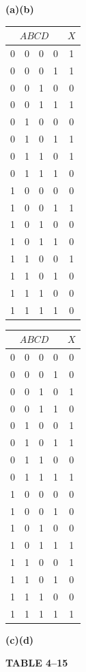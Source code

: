 \documentclass[11pt]{article}
\begin{document}
\begin{enumerate}
\begin{center}
\vspace{0.05cm}
\textbf{(a)}\hspace{2.15cm}\textbf{(b)}

\vspace{0.18cm}

\begin{tabular}{c c c c|c}
\multicolumn{4}{c|}{$ABCD$} & $X$\\ \hline
0&0&0&0&1\\0&0&0&1&1\\0&0&1&0&0\\0&0&1&1&1\\
0&1&0&0&0\\0&1&0&1&1\\0&1&1&0&1\\0&1&1&1&0\\
1&0&0&0&0\\1&0&0&1&1\\1&0&1&0&0\\1&0&1&1&0\\
1&1&0&0&1\\1&1&0&1&0\\1&1&1&0&0\\1&1&1&1&0
\end{tabular}
\hspace{0.12cm}
\begin{tabular}{c c c c|c}
\multicolumn{4}{c|}{$ABCD$} & $X$\\ \hline
0&0&0&0&0\\0&0&0&1&0\\0&0&1&0&1\\0&0&1&1&0\\
0&1&0&0&1\\0&1&0&1&1\\0&1&1&0&0\\0&1&1&1&1\\
1&0&0&0&0\\1&0&0&1&0\\1&0&1&0&0\\1&0&1&1&1\\
1&1&0&0&1\\1&1&0&1&0\\1&1&1&0&0\\1&1&1&1&1
\end{tabular}

\vspace{0.05cm}
\textbf{(c)}\hspace{2.30cm}\textbf{(d)}

\vspace{0.06cm}
\textbf{TABLE 4--15}
\end{center}


\end{enumerate}
\end{document}
